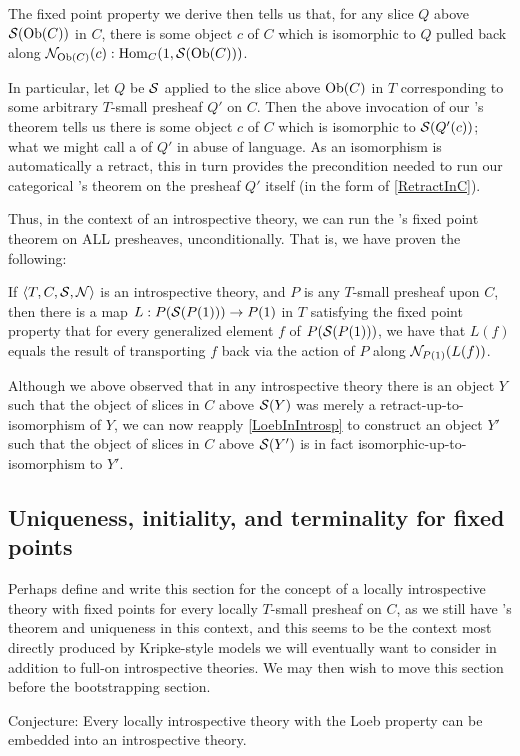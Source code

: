 The fixed point property we derive then tells us that, for any slice $Q$ above $\mathcal{S}(\operatorname{Ob}(C))$ in $C$, there is some object $c$ of $C$ which is isomorphic to $Q$ pulled back along $\mathcal{N}_{\operatorname{Ob}(C)}(c) : \operatorname{Hom}_C(1, \mathcal{S}(\operatorname{Ob}(C)))$.

In particular, let $Q$ be $\mathcal{S}$ applied to the slice above $\operatorname{Ob}(C)$ in $T$ corresponding to some arbitrary $T$-small presheaf $Q'$ on $C$. Then the above invocation of our \Loeb's theorem tells us there is some object $c$ of $C$ which is isomorphic to $\mathcal{S}(Q'(c))$; what we might call a  of $Q'$ in abuse of language. As an isomorphism is automatically a retract, this in turn provides the precondition needed to run our categorical \Loeb's theorem on the presheaf $Q'$ itself (in the form of \cref{RetractInC}).

Thus, in the context of an introspective theory, we can run the \Loeb's fixed point theorem on ALL presheaves, unconditionally. That is, we have proven the following:

\label{LoebInIntrosp}
If $\langle T, C, \mathcal{S}, \mathcal{N} \rangle$ is an introspective theory, and $P$ is any $T$-small presheaf upon $C$, then there is a map $L : P(\mathcal{S}(P(1))) \to P(1)$ in $T$ satisfying the fixed point property that for every generalized element $f$ of $P(\mathcal{S}(P(1)))$, we have that $L(f)$ equals the result of transporting $f$ back via the action of $P$ along $\mathcal{N}_{P(1)}(L(f))$.

\begin{observation}
Although we above observed that in any introspective theory there is an object $Y$ such that the object of slices in $C$ above $\mathcal{S}(Y)$ was merely a retract-up-to-isomorphism of $Y$, we can now reapply \cref{LoebInIntrosp} to construct an object $Y'$ such that the object of slices in $C$ above $\mathcal{S}(Y')$ is in fact isomorphic-up-to-isomorphism to $Y'$. 
\end{observation}

\subsection{Uniqueness, initiality, and terminality for fixed points}
\begin{TODOblock}
Perhaps define and write this section for the concept of a locally introspective theory with fixed points for every locally $T$-small presheaf on $C$, as we still have \Loeb's theorem and uniqueness in this context, and this seems to be the context most directly produced by Kripke-style models we will eventually want to consider in addition to full-on introspective theories. We may then wish to move this section before the bootstrapping section.

Conjecture: Every locally introspective theory with the Loeb property can be embedded into an introspective theory.
\end{TODOblock}


